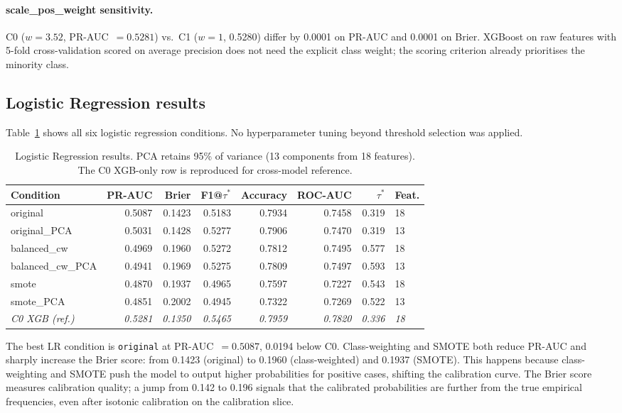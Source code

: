 \documentclass[12pt,a4paper]{article}
\begin{document}
\paragraph{scale\_pos\_weight sensitivity.}
C0 ($w = 3.52$, PR-AUC~$= 0.5281$) vs.\ C1 ($w = 1$, 0.5280) differ by
0.0001 on PR-AUC and 0.0001 on Brier. XGBoost on raw features with 5-fold
cross-validation scored on average precision does not need the explicit
class weight; the scoring criterion already prioritises the minority class.

\subsection{Logistic Regression results}

Table~\ref{tab:lr_results} shows all six logistic regression conditions.
No hyperparameter tuning beyond threshold selection was applied.

\begin{table}[H]
\centering
\caption{Logistic Regression results. PCA retains 95\% of variance (13 components
         from 18 features). The C0 XGB-only row is reproduced for cross-model
         reference.}
\label{tab:lr_results}
\small
\begin{tabular}{lrrrrrrl}
\toprule
Condition & PR-AUC & Brier & F1@$\tau^*$ & Accuracy & ROC-AUC & $\tau^*$ & Feat. \\
\midrule
original             & 0.5087 & 0.1423 & 0.5183 & 0.7934 & 0.7458 & 0.319 & 18 \\
original\_PCA        & 0.5031 & 0.1428 & 0.5277 & 0.7906 & 0.7470 & 0.319 & 13 \\
balanced\_cw         & 0.4969 & 0.1960 & 0.5272 & 0.7812 & 0.7495 & 0.577 & 18 \\
balanced\_cw\_PCA    & 0.4941 & 0.1969 & 0.5275 & 0.7809 & 0.7497 & 0.593 & 13 \\
smote                & 0.4870 & 0.1937 & 0.4965 & 0.7597 & 0.7227 & 0.543 & 18 \\
smote\_PCA           & 0.4851 & 0.2002 & 0.4945 & 0.7322 & 0.7269 & 0.522 & 13 \\
\midrule
\textit{C0 XGB (ref.)} & \textit{0.5281} & \textit{0.1350} & \textit{0.5465} & \textit{0.7959} & \textit{0.7820} & \textit{0.336} & \textit{18} \\
\bottomrule
\end{tabular}
\end{table}

The best LR condition is \texttt{original} at PR-AUC~$= 0.5087$, 0.0194
below C0. Class-weighting and SMOTE both reduce PR-AUC and sharply increase
the Brier score: from 0.1423 (original) to 0.1960 (class-weighted) and 0.1937
(SMOTE). This happens because class-weighting and SMOTE push the model to
output higher probabilities for positive cases, shifting the calibration
curve. The Brier score measures calibration quality; a jump from 0.142 to
0.196 signals that the calibrated probabilities are further from the true
empirical frequencies, even after isotonic calibration on the calibration
slice.
\end{document}

